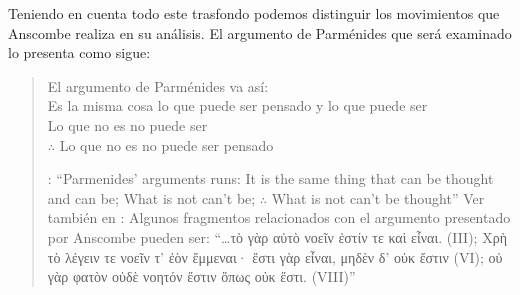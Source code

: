 Teniendo en cuenta todo este trasfondo podemos distinguir los movimientos que Anscombe realiza en su análisis. El argumento de Parménides que será examinado lo presenta como sigue: \blockquote[{\cite[3]{anscombe1981parmenides:pmc}}: \enquote{Parmenides' arguments runs: It is the same thing that can be thought and can be; What is not can't be; $\therefore$ What is not can't be thought} Ver también en {\cite[22-25]{parmenides2007poema}}: Algunos fragmentos relacionados con el argumento presentado por Anscombe pueden ser: \enquote{\ldots\textgreek{τὸ γὰρ αὐτὸ νοεῖν ἐστίν τε καὶ εἶναι.} (III); \textgreek{Χρὴ τὸ λέγειν τε νοεῖν τ' ἐὸν ἔμμεναι· ἔστι γὰρ εἶναι, μηδὲν δ' οὐκ ἔστιν} (VI); \textelp{} \textgreek{οὐ γὰρ φατὸν οὐδὲ νοητόν ἔστιν ὅπως οὐκ ἔστι.} (VIII)}]{El argumento de Parménides va así:\\
Es la misma cosa lo que puede ser pensado y lo que puede ser\\
Lo que no es no puede ser\\
$\therefore$ Lo que no es no puede ser pensado}

